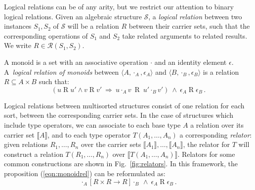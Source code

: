 \documentclass[acmsmall,screen,review,anonymous]{acmart}
\newcommand{\ifr}[1]{\mathrel{[{#1}]}}
\begin{document}
Logical relations can be of any arity,
but
we restrict our attention to
binary logical relations.
Given an algebraic structure $\mathcal{S}$,
a \emph{logical relation}
between two instances $S_1, S_2$ of $\mathcal{S}$
will be a relation $R$
between their carrier sets,
such that the corresponding operations of $S_1$ and $S_2$
take related arguments to related results.
We write $R \in \mathcal{R}(S_1, S_2)$.

\begin{example}%
\label{ex:monoid}
A monoid is a set with
an associative operation $\cdot$ and
an identity element $\epsilon$.
A~\emph{logical relation of monoids} between
$\langle A, \cdot_A, \epsilon_A \rangle$ and
$\langle B, \cdot_B, \epsilon_B \rangle$
is a relation $R \subseteq A \times B$
such that:
\begin{equation}
\label{eqn:monoidrel}
(u \mathrel{R} u' \wedge v \mathrel{R} v' \: \Rightarrow \:
 u \cdot_A v \: \mathrel{R} \: u' \cdot_B v')
\: \wedge \:
\epsilon_A \mathrel{R} \epsilon_B \,.
\end{equation}
\end{example}

Logical relations between multisorted structures
consist of one relation for each sort,
between the corresponding carrier sets.
In the case of structures which include type operators,
we can associate to each base type $A$
a relation over its carrier set $\llbracket A \rrbracket$,
and to each type operator $T(A_1, \ldots, A_n)$
a corresponding \emph{relator}:
given relations $R_1, \ldots, R_n$ over
the carrier sets $\llbracket A_1 \rrbracket, \ldots, \llbracket A_n \rrbracket$,
the relator for $T$
will construct a relation $T(R_1, \ldots, R_n)$
over $\llbracket T(A_1, \ldots, A_n) \rrbracket$.
Relators for some common constructions are shown in Fig.~\ref{fig:relators}.
In this framework, the proposition (\ref{eqn:monoidrel}) can be reformulated as:
\[
  \cdot_A \ifr{R \times R \rightarrow R} \cdot_B
  \: \wedge \:
  \epsilon_A \mathrel{R} \epsilon_B \,.
\]
\end{document}
